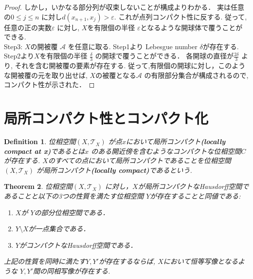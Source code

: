 \documentclass[dvipdfmx]{jbook}
\newtheorem{theorem}{Theorem}[section]
\newtheorem{definition}[theorem]{Definition}
\theoremstyle{remark}
\theoremstyle{plain}
\begin{document}
\begin{proof}
	 しかし，いかなる部分列が収束しないことが構成よりわかる．
	 実は任意の$0 \le j \le n$ に対し$d(x_{n+1},x_j)>\varepsilon$. 
	 これが点列コンパクト性に反する. 
	 従って, 任意の正の実数$\varepsilon$ に対し, $X$を有限個の半径 $\varepsilon$となるような開球体で覆うことができる.\\
	 Step3:  $X$の開被覆 $\mathcal{A}$ を任意に取る. 
	 Step1より Lebesgue number $\delta$が存在する. 
	 Step2より$X$を有限個の半径 $\frac{\delta}{3}$ の開球で覆うことができる．
	 各開球の直径が$\frac{2\delta}{3}$ より, 
	 それを含む開被覆の要素が存在する. 
	 従って,有限個の開球に対し，このような開被覆の元を取り出せば,
	 $X$の被覆となる$\mathcal{A}$ の有限部分集合が構成されるので, 
	 コンパクト性が示された．
\end{proof}

\section{局所コンパクト性とコンパクト化}

\begin{definition}
	位相空間$\left( X , \mathcal{T}_{X} \right)$ が点$x$において局所コンパクト\textbf{(locally compact at x)}であるとは$x$ のある開近傍を含むようなコンパクトな位相空間$C$が存在する.  $X$のすべての点において局所コンパクトであることを位相空間 $\left( X , \mathcal{T}_{X} \right)$ が局所コンパクト\textbf{(locally compact)}であるという.
\end{definition}

\begin{theorem}
	位相空間$\left( X , \mathcal{T}_{X} \right)$ に対し，$X$が局所コンパクトなHausdorff空間であることと以下の3つの性質を満たす位相空間 $Y$が存在することと同値である:
	 \begin{enumerate}
		\item $X$が $Y$の部分位相空間である．
		\item $Y \setminus X$が一点集合である．
		\item $Y$がコンパクトなHausdorff空間である．
	\end{enumerate}
	上記の性質を同時に満たす$Y,Y'$が存在するならば,  $X$において恒等写像となるような $Y,Y'$間の同相写像が存在する.
\end{theorem}
\end{document}
